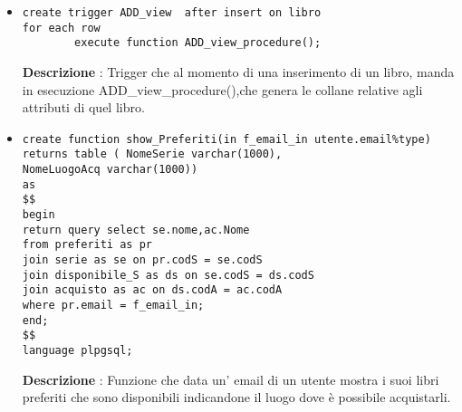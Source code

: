 \begin{itemize}
\item\begin{verbatim}
create trigger ADD_view  after insert on libro
for each row
        execute function ADD_view_procedure();
\end{verbatim}
{\bf Descrizione} : Trigger che al momento di una inserimento di un libro, manda in esecuzione ADD\_view\_procedure(),che genera le collane relative agli attributi di quel libro.



\item\begin{verbatim}
create function show_Preferiti(in f_email_in utente.email%type)  
returns table ( NomeSerie varchar(1000),
NomeLuogoAcq varchar(1000)) 
as 
$$
begin
return query select se.nome,ac.Nome
from preferiti as pr
join serie as se on pr.codS = se.codS 
join disponibile_S as ds on se.codS = ds.codS 
join acquisto as ac on ds.codA = ac.codA
where pr.email = f_email_in;
end;
$$
language plpgsql;
\end{verbatim}
{\bf Descrizione} : Funzione che data un' email di un utente mostra i suoi libri preferiti che sono disponibili indicandone il luogo dove è possibile acquistarli.
\end{itemize}